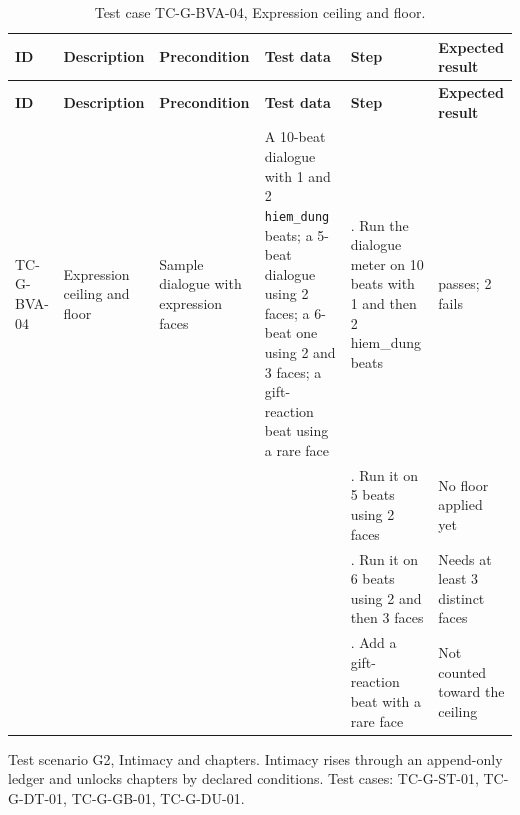 {\footnotesize{}\renewcommand{\arraystretch}{1.1}
\begin{longtable}{|>{\raggedright\arraybackslash}p{}|>{\raggedright\arraybackslash}p{}|>{\raggedright\arraybackslash}p{}|>{\raggedright\arraybackslash}p{}|>{\raggedright\arraybackslash}p{}|>{\raggedright\arraybackslash}p{}|}
\caption{Test case TC-\allowbreak{}G-\allowbreak{}BVA-\allowbreak{}04, Expression ceiling and floor.} \\
\hline
\textbf{ID} & \textbf{Description} & \textbf{Precondition} & \textbf{Test data} & \textbf{Step} & \textbf{Expected result} \\ \hline
\endfirsthead
\hline
\textbf{ID} & \textbf{Description} & \textbf{Precondition} & \textbf{Test data} & \textbf{Step} & \textbf{Expected result} \\ \hline
\endhead
TC-G-BVA-04 & Expression ceiling and floor & Sample dialogue with expression faces & A 10-beat dialogue with 1 and 2 \texttt{hiem\_\allowbreak{}dung} beats; a 5-beat dialogue using 2 faces; a 6-beat one using 2 and 3 faces; a gift-\allowbreak{}reaction beat using a rare face & 1. Run the dialogue meter on 10 beats with 1 and then 2 hiem\_dung beats & 1 passes; 2 fails \\ \cline{5-6}
 &  &  &  & 2. Run it on 5 beats using 2 faces & No floor applied yet \\ \cline{5-6}
 &  &  &  & 3. Run it on 6 beats using 2 and then 3 faces & Needs at least 3 distinct faces \\ \cline{5-6}
 &  &  &  & 4. Add a gift-\allowbreak{}reaction beat with a rare face & Not counted toward the ceiling \\ \hline
\end{longtable}
}

Test scenario G2, Intimacy and chapters. Intimacy rises through an append-only ledger and unlocks chapters by declared conditions. Test cases: TC-G-ST-01, TC-G-DT-01, TC-G-GB-01, TC-G-DU-01.

